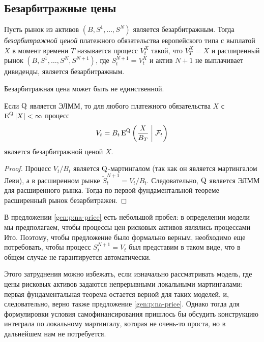\subsection{Безарбитражные цены}

\begin{definition}
Пусть рынок из активов $(B,S^1,\dots,S^N)$ является безарбитражным.
Тогда \emph{безарбитражной ценой} платежного обязательства европейского типа с выплатой $X$ в момент времени $T$ называется процесс $V_t^X$ такой, что $V_T^X = X$ и расширенный рынок $(B,S^1,\dots,S^N,S^{N+1})$, где $S^{N+1}_t = V_t^X$ и актив $N+1$ не выплачивает дивиденды, является безарбитражным.
\end{definition}

\begin{remark}
Безарбитражная цена может быть не единственной.
\end{remark}

\begin{proposition}
\label{gen:p:na-price}
Если $\mathrm{Q}$ является ЭЛММ, то для любого платежного обязательства $X$ с $\operatorname{E}^{\mathrm{Q}} |X| < \infty$ процесс 
\[
V_t = B_t \operatorname{E}^{\mathrm{Q}} \left(\frac{X}{B_T} \;\bigg|\; \mathcal{F}_t\right)
\]
является безарбитражной ценой $X$.
\end{proposition}

\begin{proof}
Процесс $V_t/B_t$ является $\mathrm{Q}$-мартингалом (так как он является мартингалом Леви), а в расширенном рынке $\tilde S_t^{N+1} = V_t/B_t$. 
Следовательно, $\mathrm{Q}$ является ЭЛММ для расширенного рынка.
Тогда по первой фундаментальной теореме расширенный рынок безарбитражен.
\end{proof}

\begin{remark}
В предложении \ref{gen:p:na-price} есть небольшой пробел: в определении модели мы предполагаем, чтобы процессы цен рисковых активов являлись процессами Ито.
Поэтому, чтобы предложение было формально верным, необходимо еще потребовать, чтобы процесс $S_t^{N+1} = V_t$ был представим в таком виде, что в общем случае не гарантируется автоматически. 

Этого затруднения можно избежать, если изначально рассматривать модель, где цены рисковых активов задаются непрерывными локальными мартингалами: первая фундаментальная теорема остается верной для таких моделей, и, следовательно, верно также предложение \ref{gen:p:na-price}.
Однако тогда для формулировки условия самофинансирования пришлось бы обсудить конструкцию интеграла по локальному мартингалу, которая не очень-то проста, но в дальнейшем нам не потребуется.
\end{remark}

